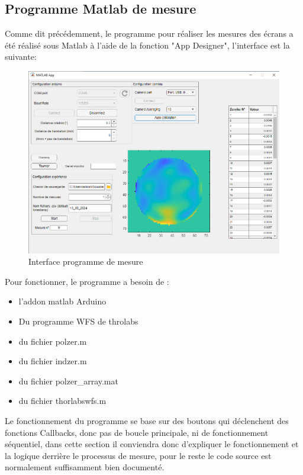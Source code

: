\newpage
\subsection{Programme Matlab de mesure}
Comme dit précédemment, le programme pour réaliser les mesures des écrans a été réalisé sous Matlab à l'aide de la fonction "App Designer", l'interface est la suivante:
\begin{figure}[H]
    \centering
    \includegraphics[width = \textwidth]{assets/figures/ameliorations/capture interface.png}
    \caption{Interface programme de mesure}
\end{figure}
Pour fonctionner, le programme a besoin de :
\begin{itemize}
    \item l'addon matlab Arduino
    \item Du programme WFS de throlabs \cite{WFS_thorlabs_site}
    \item du fichier polzer.m
    \item du fichier indzer.m
    \item du fichier polzer\_array.mat
    \item du fichier thorlabswfs.m
\end{itemize}

Le fonctionnement du programme se base sur des boutons qui déclenchent des fonctions Callbacks, donc pas de boucle principale,
ni de fonctionnement séquentiel, dans cette section il conviendra donc d'expliquer le fonctionnement et la logique derrière le processus
de mesure, pour le reste le code source est normalement suffisamment bien documenté.
\newpage

